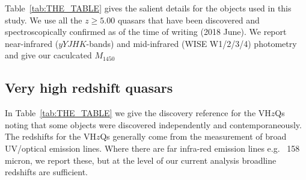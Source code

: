 \documentclass[usenatbib]{mnras}
\begin{document}


Table~\ref{tab:THE_TABLE} gives the salient details for the objects
used in this study. We use all the $z\geq5.00$ quasars that
have been discovered and spectroscopically confirmed as of the time of
writing (2018 June). We report near-infrared ($yYJHK$-bands)
and mid-infrared (WISE W1/2/3/4) photometry and give our caculcated 
$M_{1450}$

\subsection{Very high redshift quasars}
In Table~\ref{tab:THE_TABLE} we give the discovery reference for the
VH$z$Qs noting that some objects were discovered independently and
contemporaneously.  The redshifts for the VH$z$Qs generally come from
the measurement of broad UV/optical emission lines. Where 
there are far infra-red emission lines e.g. \cii~158 micron, we report 
these, but at the level of our current analysis broadline redshifts are
sufficient. 
\end{document}
